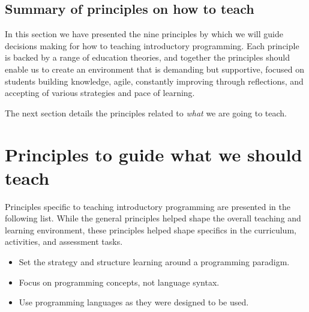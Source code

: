 



\subsection{Summary of principles on how to teach} %
\label{ssub:summary_of_principles_on_how_to_teach}

In this section we have presented the nine principles by which we will guide decisions making for how to teaching introductory programming. Each principle is backed by a range of education theories, and together the principles should enable us to create an environment that is demanding but supportive, focused on students building knowledge, agile, constantly improving through reflections, and accepting of various strategies and pace of learning.

The next section details the principles related to \emph{what} we are going to teach.




\clearpage
\section{Principles to guide what we should teach} %
\label{sec:principles_to_guide_what_we_should_cover}

Principles specific to teaching introductory programming are presented in the following list. While the general principles helped shape the overall teaching and learning environment, these principles helped shape specifics in the curriculum, activities, and assessment tasks.

\begin{itemize}
	\item Set the strategy and structure learning around a programming paradigm.
	\item Focus on programming concepts, not language syntax.
	\item Use programming languages as they were designed to be used.
\end{itemize}

